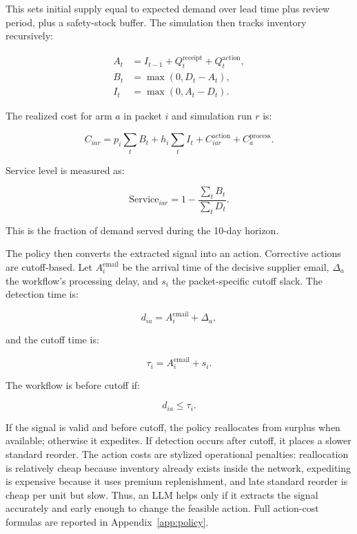 \documentclass[11pt]{article}
\begin{document}
This sets initial supply equal to expected demand over lead time plus review period, plus a safety-stock buffer. The simulation then tracks inventory recursively:

\begin{align}
A_t &= I_{t-1} + Q_t^{\text{receipt}} + Q_t^{\text{action}},\\
B_t &= \max(0, D_t - A_t),\\
I_t &= \max(0, A_t - D_t).
\end{align}

The realized cost for arm $a$ in packet $i$ and simulation run $r$ is:

\begin{equation}
C_{iar}=p_i\sum_t B_t + h_i\sum_t I_t + C_{iar}^{\text{action}} + C_a^{\text{process}}.
\end{equation}

Service level is measured as:

\begin{equation}
\text{Service}_{iar}=1-\frac{\sum_t B_t}{\sum_t D_t}.
\end{equation}

This is the fraction of demand served during the 10-day horizon.

The policy then converts the extracted signal into an action. Corrective actions are cutoff-based. Let $A_i^{\text{email}}$ be the arrival time of the decisive supplier email, $\Delta_a$ the workflow's processing delay, and $s_i$ the packet-specific cutoff slack. The detection time is:

\begin{equation}
d_{ia}=A_i^{\text{email}}+\Delta_a,
\end{equation}

and the cutoff time is:

\begin{equation}
\tau_i=A_i^{\text{email}}+s_i.
\end{equation}

The workflow is before cutoff if:

\begin{equation}
d_{ia}\leq \tau_i.
\end{equation}

If the signal is valid and before cutoff, the policy reallocates from surplus when available; otherwise it expedites. If detection occurs after cutoff, it places a slower standard reorder. The action costs are stylized operational penalties: reallocation is relatively cheap because inventory already exists inside the network, expediting is expensive because it uses premium replenishment, and late standard reorder is cheap per unit but slow. Thus, an LLM helps only if it extracts the signal accurately and early enough to change the feasible action. Full action-cost formulas are reported in Appendix~\ref{app:policy}.
\end{document}
